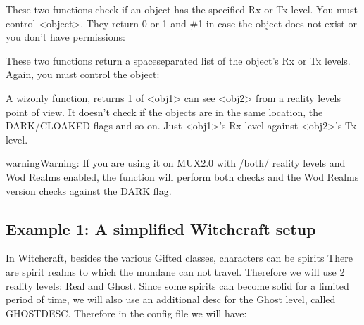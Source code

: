 \documentclass[letterpaper,10pt,english]{sphinxmanual}
\begin{document}
\begin{sphinxVerbatim}[commandchars=\\\{\}]
\end{sphinxVerbatim}

\sphinxAtStartPar
These two functions check if an object has the specified Rx or Tx level.
You must control \textless{}object\textgreater{}. They return 0 or 1 and \#\sphinxhyphen{}1 in case the object
does not exist or you don’t have permissions:

\begin{sphinxVerbatim}[commandchars=\\\{\}]
\end{sphinxVerbatim}

\sphinxAtStartPar
These two functions return a space\sphinxhyphen{}separated list of the object’s Rx or Tx
levels. Again, you must control the object:

\begin{sphinxVerbatim}[commandchars=\\\{\}]
\end{sphinxVerbatim}

\sphinxAtStartPar
A wiz\sphinxhyphen{}only function, returns 1 of \textless{}obj1\textgreater{} can see \textless{}obj2\textgreater{} from a reality
levels point of view. It doesn’t check if the objects are in the same
location, the DARK/CLOAKED flags and so on. Just \textless{}obj1\textgreater{}’s Rx level against
\textless{}obj2\textgreater{}’s Tx level.

\begin{sphinxadmonition}{warning}{Warning:}
\sphinxAtStartPar
If you are using it on MUX2.0 with /both/ reality levels and Wod
Realms enabled, the function will perform both checks and the Wod Realms
version checks against the DARK flag.
\end{sphinxadmonition}


\subsection{Example 1: A simplified Witchcraft setup}
\label{\detokenize{advanced:example-1-a-simplified-witchcraft-setup}}
\sphinxAtStartPar
In Witchcraft, besides the various Gifted classes, characters can be spirits
There are spirit realms to which the mundane can not travel. Therefore we
will use 2 reality levels: Real and Ghost. Since some spirits can become
solid for a limited period of time, we will also use an additional desc for
the Ghost level, called GHOSTDESC. Therefore in the config file we will
have:
\end{document}
